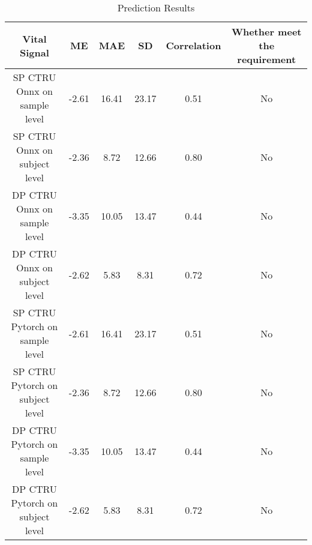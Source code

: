\documentclass{article}
\begin{document}
\begin{table}[h!]
\centering
\begin{tabular}{|c|c|c|c|c|c|}
\hline
Vital Signal & ME & MAE & SD & Correlation & Whether meet the requirement\\ \hline


SP CTRU Onnx on sample level & -2.61 & 16.41 & 23.17 & 0.51 & No \\ \hline

SP CTRU Onnx on subject level & -2.36 & 8.72 & 12.66 & 0.80 & No \\ \hline

DP CTRU Onnx on sample level & -3.35 & 10.05 & 13.47 & 0.44 & No \\ \hline

DP CTRU Onnx on subject level & -2.62 & 5.83 & 8.31 & 0.72 & No \\ \hline

SP CTRU Pytorch on sample level & -2.61 & 16.41 & 23.17 & 0.51 & No \\ \hline

SP CTRU Pytorch on subject level & -2.36 & 8.72 & 12.66 & 0.80 & No \\ \hline

DP CTRU Pytorch on sample level & -3.35 & 10.05 & 13.47 & 0.44 & No \\ \hline

DP CTRU Pytorch on subject level & -2.62 & 5.83 & 8.31 & 0.72 & No \\ \hline


\end{tabular}
\caption{Prediction Results}
\label{tab:metrics}
\end{table}
\end{document}
